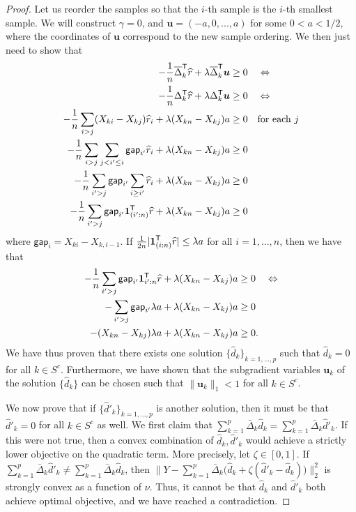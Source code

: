 \begin{proof}
Let us reorder the samples so that the $i$-th sample is the $i$-th smallest sample. 
We will construct $\gamma = 0$, and $\mathbf{u} = (-a, 0, ..., a)$ for
some $0 < a < 1/2$, where the coordinates of $\mathbf{u}$ correspond
to the new sample ordering. 
We then just need to show that
\begin{align*}
- \frac{1}{n} \overline{\Delta}_k^{\mathsf{T}} \widehat{r} + \lambda \overline{\Delta}_k^{\mathsf{T}} \mbox{\boldmath $u$} &\geq 0 \quad \Leftrightarrow \\
- \frac{1}{n} \Delta_k^{\mathsf{T}} \widehat{r} + \lambda \Delta_k^{\mathsf{T}} \mbox{\boldmath $u$} &\geq 0 \quad \Leftrightarrow\\
- \frac{1}{n} \sum_{i > j} (X_{ki} - X_{kj}) \widehat{r}_i + \lambda (X_{kn} - X_{kj})a &\geq 0 \quad 
   \textrm{for each } j \\
- \frac{1}{n} \sum_{i > j} \sum_{j < i' \leq i} \mathsf{gap}_{i'} \widehat{r}_i 
    + \lambda (X_{kn} - X_{kj})a &\geq 0 \\
- \frac{1}{n} \sum_{i' > j} \mathsf{gap}_{i'} \sum_{i \geq i'} \widehat{r}_i 
    + \lambda (X_{kn} - X_{kj})a &\geq 0 \\
- \frac{1}{n} \sum_{i' > j} \mathsf{gap}_{i'} \mbox{\boldmath $1$}_{(i':n)}^{\mathsf{T}} \widehat{r} 
   + \lambda (X_{kn} - X_{kj})a &\geq 0 
\end{align*}
where $\mathsf{gap}_i = X_{ki} - X_{k,i-1}$. If $\frac{1}{2n} |\mbox{\boldmath $1$}_{(i:n)}^{\mathsf{T}} \widehat{r}| \leq \lambda a$ for all $i=1,...,n$, then we have that
\begin{align*}
- \frac{1}{n} \sum_{i' > j} \mathsf{gap}_{i'} \mbox{\boldmath $1$}_{i':n}^{\mathsf{T}} \widehat{r}
   + \lambda (X_{kn} - X_{kj})a &\geq 0 \quad \Leftrightarrow \\
- \sum_{i' > j} \mathsf{gap}_{i'} \lambda a + \lambda (X_{kn} - X_{kj}) a &\geq 0\\
- (X_{kn} - X_{kj}) \lambda a + \lambda (X_{kn} - X_{kj}) a &\geq 0.
\end{align*}
We have thus proven that there exists one solution $\{ \hat{d}_k
\}_{k=1,...,p}$ such that $\hat{d}_k = 0$ for all $k \in
S^c$. Furthermore, we have shown that the subgradient variables
$\mathbf{u}_k$ of the solution $\{ \hat{d}_k \}$ can be chosen such
that $\| \mathbf{u}_k \|_1 < 1$ for all $k \in S^c$.  

We now prove that if $\{ \hat{d}'_k \}_{k = 1,..., p}$ is another
solution, then it must be that $\hat{d}'_k = 0$ for all $k \in S^c$ as
well.  We first claim that $\sum_{k=1}^p \bar{\Delta}_k \hat{d}_k =
\sum_{k=1}^p \bar{\Delta}_k \hat{d}'_k$. If this were not true, then a
convex combination of $\hat{d}_k, \hat{d}'_k$ would achieve a strictly
lower objective on the quadratic term. More precisely, let $\zeta \in
[0,1]$. If $\sum_{k=1}^p \bar{\Delta}_k \hat{d}'_k \neq \sum_{k=1}^p
\bar{\Delta}_k \hat{d}_k$, then $\| Y - \sum_{k=1}^p \bar{\Delta}_k
\big( \hat{d}_k + \zeta ( \hat{d}'_k - \hat{d}_k) \big) \|_2^2$ is
strongly convex as a function of $\nu$. Thus, it cannot be that
$\hat{d}_k$ and $\hat{d}'_k$ both achieve optimal objective, and we
have reached a contradiction.


\end{proof}
